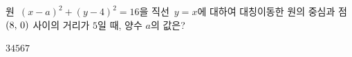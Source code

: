 원~$(x-a)^2+(y-4)^2=16$을 직선~$y=x$에 대하여 대칭이동한 원의 중심과 점~$(8,\mkern3mu 0)$ 사이의 거리가 $5$일 때, 양수 $a$의 값은?
\begin{choices32}{$3$}{$4$}{$5$}{$6$}{$7$}\end{choices32}
